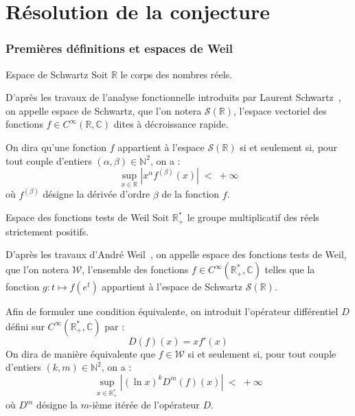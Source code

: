 \documentclass[Riemann_Hypothesis.tex]{subfiles}
\begin{document}
\pagebreak
\color{red}
\part{Résolution de la conjecture}
\color{black}

\color{red}
\section{Premières définitions et espaces de Weil}
\color{black}

\begin{DefNef}[label=df:EspaceSchwartz_fr]{Espace de Schwartz}
    Soit $\mathbb{R}$ le corps des nombres réels. \par
    D'après les travaux de l'analyse fonctionnelle introduits par Laurent 
    Schwartz~\cite{schwartz1966_distributions}, on appelle espace de Schwartz, 
    que l'on notera $\mathcal{S}(\mathbb{R})$, l'espace vectoriel des 
    fonctions $f \in C^\infty(\mathbb{R}, \mathbb{C})$ dites à décroissance 
    rapide. \par
    On dira qu'une fonction $f$ appartient à l'espace $\mathcal{S}(\mathbb{R})$ si et seulement si, pour tout couple d'entiers $(\alpha, \beta) \in \mathbb{N}^2$, on a :
    \begin{equation*}
        \sup_{x \in \mathbb{R}} \left| x^\alpha f^{(\beta)}(x) \right| \;<\; +\infty
    \end{equation*}
    où $f^{(\beta)}$ désigne la dérivée d'ordre $\beta$ de la fonction $f$.
\end{DefNef}

\begin{DefNef}[label=df:EspaceWeil_fr]{Espace des fonctions tests de Weil}
    Soit $\mathbb{R}_+^*$ le groupe multiplicatif des réels strictement positifs. \par
    D'après les travaux d'André Weil~\cite{weil1952_formules}, 
    on appelle espace des fonctions tests de Weil, que l'on notera $\mathcal{W}$, l'ensemble des fonctions $f \in C^\infty(\mathbb{R}_+^*, \mathbb{C})$ telles que la fonction $g : t \mapsto f(e^t)$ appartient à l'espace de Schwartz $\mathcal{S}(\mathbb{R})$. \par
    Afin de formuler une condition équivalente, on introduit l'opérateur différentiel $D$ défini sur $C^\infty(\mathbb{R}_+^*, \mathbb{C})$ par :
    \begin{equation*}
        D(f)(x) = x f'(x)
    \end{equation*}
    On dira de manière équivalente que $f \in \mathcal{W}$ si et seulement si, pour tout couple d'entiers $(k, m) \in \mathbb{N}^2$, on a :
    \begin{equation*}
        \sup_{x \in \mathbb{R}_+^*} \left| (\ln x)^k D^m(f)(x) \right| \;<\; +\infty
    \end{equation*}
    où $D^m$ désigne la $m$-ième itérée de l'opérateur $D$.
\end{DefNef}
\end{document}
